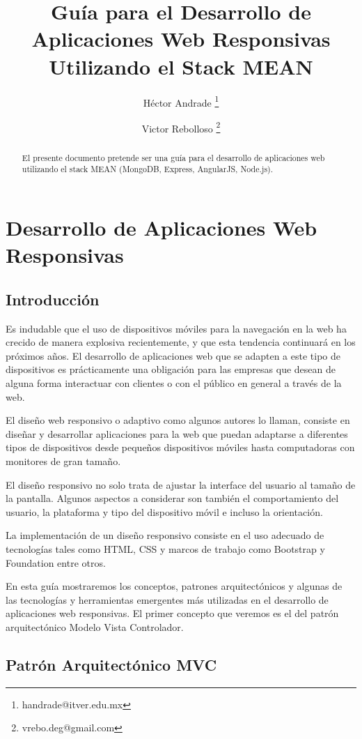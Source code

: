 \documentclass[10pt,a4paper]{report}
\title{Guía para el Desarrollo de Aplicaciones Web Responsivas Utilizando el Stack MEAN}
\author[1]{Héctor Andrade \thanks{handrade@itver.edu.mx}}
\author[1]{Victor Rebolloso \thanks{vrebo.deg@gmail.com}}
\affil[1]{Department of Computer Science, \LaTeX\ University}
\affil[2]{Department of Mechanical Engineering, \LaTeX\ University}
\begin{document}
\maketitle

\begin{abstract}
El presente documento pretende ser una guía para el desarrollo de aplicaciones web utilizando el stack MEAN (MongoDB, Express, AngularJS, Node.js).
\end{abstract}

\tableofcontents

\chapter{Desarrollo de Aplicaciones Web Responsivas}

\section{Introducción}
Es indudable que el uso de dispositivos móviles para la navegación en la web ha crecido de manera explosiva recientemente, y que esta tendencia continuará en los próximos años. El desarrollo de aplicaciones web que se adapten a este tipo de dispositivos es prácticamente una obligación para las empresas que desean de alguna forma interactuar con clientes o con el público en general a través de la web.

El diseño web responsivo o adaptivo como algunos autores lo llaman, consiste en diseñar y desarrollar aplicaciones para la web que puedan adaptarse a diferentes tipos de dispositivos desde pequeños dispositivos móviles hasta computadoras con monitores de gran tamaño.

El diseño responsivo no solo trata de ajustar la interface del usuario al tamaño de la pantalla. Algunos aspectos a considerar son también el comportamiento del usuario, la plataforma y tipo del dispositivo móvil  e incluso la orientación.

La implementación de  un diseño responsivo consiste en el uso adecuado de tecnologías tales como HTML, CSS y marcos de trabajo como Bootstrap  y Foundation entre otros.

En esta guía mostraremos los conceptos, patrones arquitectónicos  y algunas de las  tecnologías y herramientas emergentes más utilizadas en el desarrollo de aplicaciones web responsivas. El primer concepto que veremos es el del patrón arquitectónico Modelo Vista Controlador. 


\section{Patrón Arquitectónico MVC}
\end{document}
